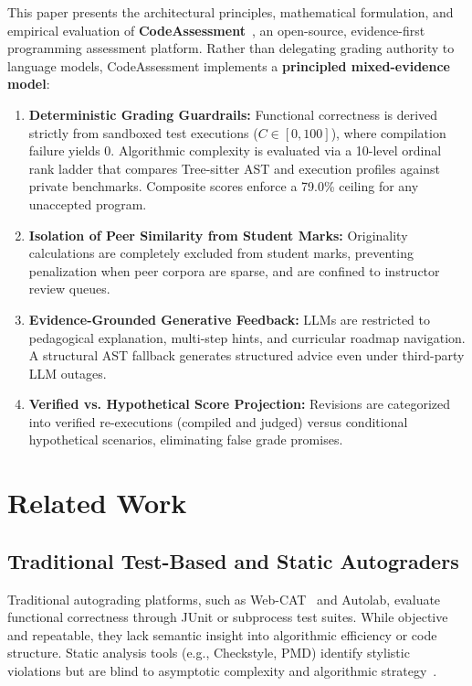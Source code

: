 \documentclass[conference]{IEEEtran}
\begin{document}
This paper presents the architectural principles, mathematical formulation, and empirical evaluation of \textbf{CodeAssessment}~\cite{codeassessment2026artifact}, an open-source, evidence-first programming assessment platform. Rather than delegating grading authority to language models, CodeAssessment implements a \textbf{principled mixed-evidence model}:
\begin{enumerate}
    \item \textbf{Deterministic Grading Guardrails:} Functional correctness is derived strictly from sandboxed test executions ($C \in [0, 100]$), where compilation failure yields 0. Algorithmic complexity is evaluated via a 10-level ordinal rank ladder that compares Tree-sitter AST and execution profiles against private benchmarks. Composite scores enforce a 79.0\% ceiling for any unaccepted program.
    \item \textbf{Isolation of Peer Similarity from Student Marks:} Originality calculations are completely excluded from student marks, preventing penalization when peer corpora are sparse, and are confined to instructor review queues.
    \item \textbf{Evidence-Grounded Generative Feedback:} LLMs are restricted to pedagogical explanation, multi-step hints, and curricular roadmap navigation. A structural AST fallback generates structured advice even under third-party LLM outages.
    \item \textbf{Verified vs. Hypothetical Score Projection:} Revisions are categorized into verified re-executions (compiled and judged) versus conditional hypothetical scenarios, eliminating false grade promises.
\end{enumerate}

\section{Related Work}

\subsection{Traditional Test-Based and Static Autograders}
Traditional autograding platforms, such as Web-CAT~\cite{edwards2008webcat} and Autolab, evaluate functional correctness through JUnit or subprocess test suites. While objective and repeatable, they lack semantic insight into algorithmic efficiency or code structure. Static analysis tools (e.g., Checkstyle, PMD) identify stylistic violations but are blind to asymptotic complexity and algorithmic strategy~\cite{vasilescu2021static}.
\end{document}
